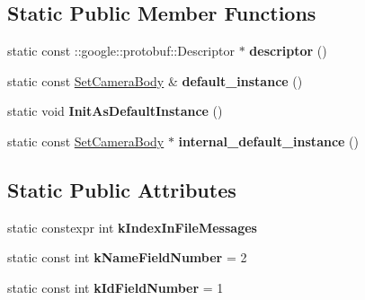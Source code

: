 \subsection*{Static Public Member Functions}
\begin{DoxyCompactItemize}
\item 
\mbox{\label{classtbBasics_1_1SetCameraBody_a2636e55242b7fbf76d12172959a66646}} 
static const \+::google\+::protobuf\+::\+Descriptor $\ast$ {\bfseries descriptor} ()
\item 
\mbox{\label{classtbBasics_1_1SetCameraBody_a4ce4547cc034699e8b165355e32f21be}} 
static const \hyperlink{classtbBasics_1_1SetCameraBody}{Set\+Camera\+Body} \& {\bfseries default\+\_\+instance} ()
\item 
\mbox{\label{classtbBasics_1_1SetCameraBody_a7d60723fb44b3243e59f01ac10cff79e}} 
static void {\bfseries Init\+As\+Default\+Instance} ()
\item 
\mbox{\label{classtbBasics_1_1SetCameraBody_a40919546ed67eac8cb1c4ef5340fa022}} 
static const \hyperlink{classtbBasics_1_1SetCameraBody}{Set\+Camera\+Body} $\ast$ {\bfseries internal\+\_\+default\+\_\+instance} ()
\end{DoxyCompactItemize}
\subsection*{Static Public Attributes}
\begin{DoxyCompactItemize}
\item 
static constexpr int {\bfseries k\+Index\+In\+File\+Messages}
\item 
\mbox{\label{classtbBasics_1_1SetCameraBody_ab29233ad9be845215bb4d04e0564dd2f}} 
static const int {\bfseries k\+Name\+Field\+Number} = 2
\item 
\mbox{\label{classtbBasics_1_1SetCameraBody_ae3c7ddf88679773acb5916f4a5b951d9}} 
static const int {\bfseries k\+Id\+Field\+Number} = 1
\end{DoxyCompactItemize}

